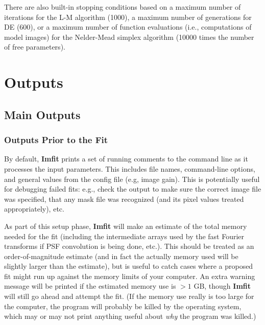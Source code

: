 \documentclass[10pt,a4paper,article]{memoir}
\newcommand{\imfit}{\textbf{Imfit}}
\begin{document}
There are also built-in stopping conditions based on a maximum number of
iterations for the L-M algorithm (1000), a maximum number of generations for DE
(600), or a maximum number of function evaluations (i.e., computations of model
images) for the Nelder-Mead simplex algorithm (10000 times the number of free
parameters).





\newpage

\chapter{Outputs}

\section{Main Outputs}

\subsection{Outputs Prior to the Fit}

By default, \imfit{} prints a set of running comments to the command
line as it processes the input parameters. This includes file names,
command-line options, and general values from the config file (e.g,
image gain). This is potentially useful for debugging failed fits: e.g.,
check the output to make sure the correct image file was specified, that
any mask file was recognized (and its pixel values treated
appropriately), etc.

As part of this setup phase, \imfit{} will make an estimate of the total
memory needed for the fit (including the intermediate arrays used by the
fast Fourier transforms if PSF convolution is being done, etc.). This
should be treated as an order-of-magnitude estimate (and in fact the
actually memory used will be slightly larger than the estimate), but is
useful to catch cases where a proposed fit might run up against the
memory limits of your computer. An extra warning message will be printed
if the estimated memory use is $> 1$ GB, though \imfit{} will still go
ahead and attempt the fit. (If the memory use really is too large for
the computer, the program will probably be killed by the operating
system, which may or may not print anything useful about \textit{why}
the program was killed.)
\end{document}
